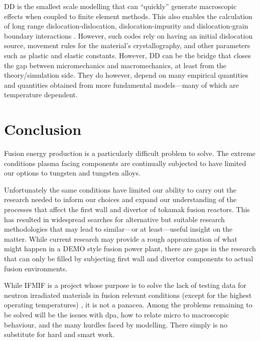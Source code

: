 \documentclass[12pt, a4paper]{article}
\begin{document}
		DD is the smallest scale modelling that can ``quickly'' generate macroscopic effects when coupled to finite element methods. This also enables the calculation of long range dislocation-dislocation, dislocation-impurity and dislocation-grain boundary interactions \cite{dd}. However, such codes rely on having an initial dislocation source, movement rules for the material's crystallography, and other parameters such as plastic and elastic constants. However, DD can be the bridge that closes the gap between micromechanics and macromechanics, at least from the theory/simulation side. They do however, depend on many empirical quantities and quantities obtained from more fundamental models---many of which are temperature dependent.
	\section{Conclusion}
		Fusion energy production is a particularly difficult problem to solve. The extreme conditions plasma facing components are continually subjected to have limited our options to tungsten and tungsten alloys.
		
		Unfortunately the same conditions have limited our ability to carry out the research needed to inform our choices and expand our understanding of the processes that affect the first wall and divertor of tokamak fusion reactors. This has resulted in widespread searches for alternative but suitable research methodologies that may lead to similar---or at least---useful insight on the matter. While current research may provide a rough approximation of what might happen in a DEMO style fusion power plant, there are gaps in the research that can only be filled by subjecting first wall and divertor components to actual fusion environments.
		
		While IFMIF is a project whose purpose is to solve the lack of testing data for neutron irradiated materials in fusion relevant conditions (except for the highest operating temperatures) \cite{ifmif}, it is not a panacea. Among the problems remaining to be solved will be the issues with dpa, how to relate micro to macroscopic behaviour, and the many hurdles faced by modelling. There simply is no substitute for hard and smart work.
	
	\singlespacing
		
	
\end{document}
